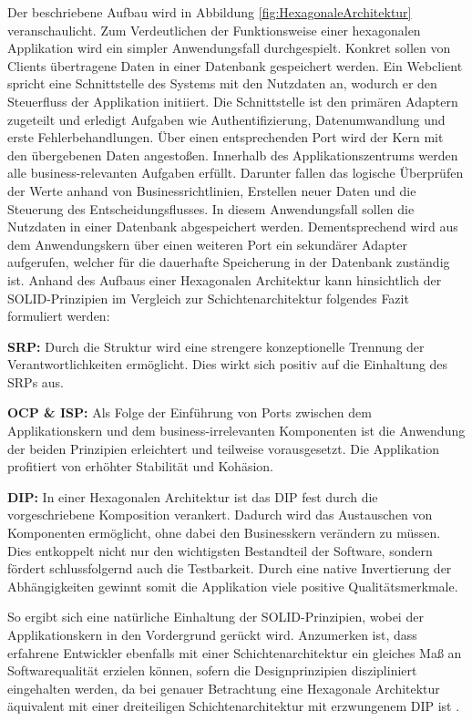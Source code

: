 Der beschriebene Aufbau wird in Abbildung \ref{fig:HexagonaleArchitektur} veranschaulicht. Zum Verdeutlichen der Funktionsweise einer hexagonalen Applikation wird ein simpler Anwendungsfall durchgespielt. Konkret sollen von Clients übertragene Daten in einer Datenbank gespeichert werden. Ein Webclient spricht eine Schnittstelle des Systems mit den Nutzdaten an, wodurch er den Steuerfluss der Applikation initiiert. Die Schnittstelle ist den primären Adaptern zugeteilt und erledigt Aufgaben wie Authentifizierung, Datenumwandlung und erste Fehlerbehandlungen. Über einen entsprechenden Port wird der Kern mit den übergebenen Daten angestoßen. Innerhalb des Applikationszentrums werden alle business-relevanten Aufgaben erfüllt. Darunter fallen das logische Überprüfen der Werte anhand von Businessrichtlinien, Erstellen neuer Daten und die Steuerung des Entscheidungsflusses. In diesem Anwendungsfall sollen die Nutzdaten in einer Datenbank abgespeichert werden. Dementsprechend wird aus dem Anwendungskern über einen weiteren Port ein sekundärer Adapter aufgerufen, welcher für die dauerhafte Speicherung in der Datenbank zuständig ist. Anhand des Aufbaus einer Hexagonalen Architektur kann hinsichtlich der SOLID-Prinzipien im Vergleich zur Schichtenarchitektur folgendes Fazit formuliert werden:

\textbf{\acrlong{SRP}: } {Durch die Struktur wird eine strengere konzeptionelle Trennung der Verantwortlichkeiten ermöglicht. Dies wirkt sich positiv auf die Einhaltung des \acrlong{SRP}s aus.}

\textbf{\acrlong{OCP} \& \acrlong{ISP}: } {Als Folge der Einführung von Ports zwischen dem Applikationskern und dem business-irrelevanten Komponenten ist die Anwendung der beiden Prinzipien erleichtert und teilweise vorausgesetzt. Die Applikation profitiert von erhöhter Stabilität und Kohäsion. }

\textbf{\acrlong{DIP}: } {In einer Hexagonalen Architektur ist das \acrlong{DIP} fest durch die vorgeschriebene Komposition verankert. Dadurch wird das Austauschen von Komponenten ermöglicht, ohne dabei den Businesskern verändern zu müssen. Dies entkoppelt nicht nur den wichtigsten Bestandteil der Software, sondern fördert schlussfolgernd auch die Testbarkeit. Durch eine native Invertierung der Abhängigkeiten gewinnt somit die Applikation viele positive Qualitätsmerkmale. \cite{Alliaume.2018, Martinez.2021}}

So ergibt sich eine natürliche Einhaltung der SOLID-Prinzipien, wobei der Applikationskern in den Vordergrund gerückt wird. Anzumerken ist, dass erfahrene Entwickler ebenfalls mit einer Schichtenarchitektur ein gleiches Maß an Softwarequalität erzielen können, sofern die Designprinzipien diszipliniert eingehalten werden, da bei genauer Betrachtung eine Hexagonale Architektur äquivalent mit einer dreiteiligen Schichtenarchitektur mit erzwungenem \acrlong{DIP} ist \cite{Seemann.2013} \cite[S. 125ff.]{Vernon.2015}. 


